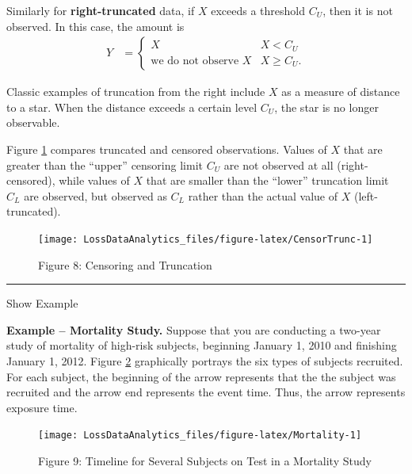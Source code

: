 \documentclass[]{book}
\theoremstyle{definition}
\theoremstyle{definition}
\theoremstyle{definition}
\theoremstyle{remark}
\begin{document}
Similarly for \textbf{right-truncated} data, if \(X\) exceeds a
threshold \(C_U\), then it is not observed. In this case, the amount is
\[\begin{aligned}
Y &=
\left\{
\begin{array}{ll}
X & X < C_U \\
\text{we do not observe }X & X \geq C_U.
\end{array}
\right.\end{aligned}\]

Classic examples of truncation from the right include \(X\) as a measure
of distance to a star. When the distance exceeds a certain level
\(C_U\), the star is no longer observable.

Figure \ref{fig:CensorTrunc} compares truncated and censored
observations. Values of \(X\) that are greater than the ``upper''
censoring limit \(C_U\) are not observed at all (right-censored), while
values of \(X\) that are smaller than the ``lower'' truncation limit
\(C_L\) are observed, but observed as \(C_L\) rather than the actual
value of \(X\) (left-truncated).

\begin{figure}

{\centering \texttt{[image: LossDataAnalytics\_files/figure-latex/CensorTrunc-1]} 

}

\caption{Figure 8: Censoring and Truncation}\label{fig:CensorTrunc}
\end{figure}

\begin{center}\rule{0.5\linewidth}{\linethickness}\end{center}

Show Example

\hypertarget{toggleExampleMort}{}
\textbf{Example -- Mortality Study.} Suppose that you are conducting a
two-year study of mortality of high-risk subjects, beginning January 1,
2010 and finishing January 1, 2012. Figure \ref{fig:Mortality}
graphically portrays the six types of subjects recruited. For each
subject, the beginning of the arrow represents that the the subject was
recruited and the arrow end represents the event time. Thus, the arrow
represents exposure time.

\begin{figure}

{\centering \texttt{[image: LossDataAnalytics\_files/figure-latex/Mortality-1]} 

}

\caption{Figure 9: Timeline for Several Subjects on Test in a Mortality Study}\label{fig:Mortality}
\end{figure}
\end{document}
